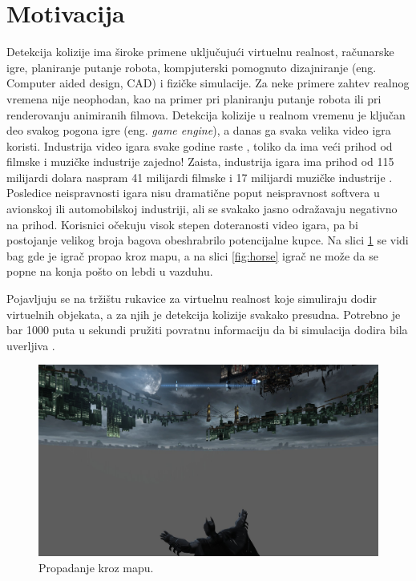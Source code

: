 \documentclass[12pt,oneside]{memoir}
\begin{document}
\section{Motivacija}
\label{sec:naslov1}
Detekcija kolizije ima široke primene uključujući virtuelnu realnost, računarske igre, planiranje putanje robota, kompjuterski 
pomognuto dizajniranje (eng. {Computer aided design, CAD}) i fizičke simulacije. 
Za neke primere zahtev realnog vremena nije neophodan, kao na primer pri planiranju putanje robota ili pri renderovanju 
animiranih filmova.
Detekcija kolizije u realnom vremenu je ključan deo svakog pogona igre (eng. {\em game engine}), a danas ga svaka velika
video igra koristi. Industrija video igara svake godine raste \cite{game_industry},
toliko da ima veći prihod od filmske i muzičke industrije zajedno! Zaista, industrija igara ima prihod od
115 milijardi dolara naspram 41 milijardi filmske i 17 milijardi muzičke industrije \cite{music} \cite{movie} \cite{game_industry}.
Posledice neispravnosti igara nisu dramatične poput neispravnost softvera u avionskoj ili automobilskoj industriji, ali 
se svakako jasno odražavaju negativno na prihod.
Korisnici očekuju visok stepen doteranosti video igara, pa bi postojanje velikog broja bagova 
 obeshrabrilo potencijalne kupce. Na slici \ref{fig:batman} se vidi bag gde je igrač propao kroz 
 mapu, a na slici \ref{fig:horse} igrač ne može da se popne na konja pošto on lebdi u vazduhu.

Pojavljuju se na tržištu rukavice za virtuelnu realnost koje simuliraju dodir virtuelnih objekata, a za njih je 
detekcija kolizije svakako presudna. Potrebno je bar 1000 puta u sekundi pružiti povratnu informaciju
da bi simulacija dodira bila uverljiva \cite{haptic}. 

\begin{figure}[h!]
\centering
\includegraphics[scale=0.22]{batman.jpg}
\caption{Propadanje kroz mapu.}
\label{fig:batman}
\end{figure}
\end{document}
